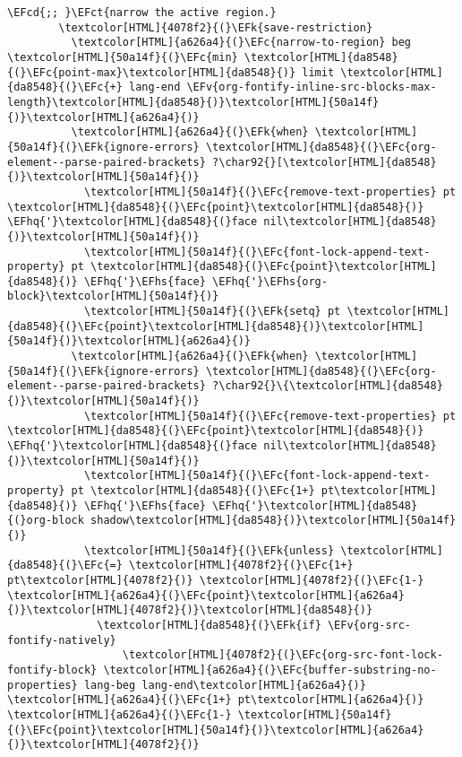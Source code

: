 \documentclass{scrartcl}
\newcommand{\EFk}[1]{\textcolor{EFk}{#1}} %
\newcommand{\EFct}[1]{\textcolor{EFct}{#1}} %
\newcommand{\EFc}[1]{\textcolor{EFc}{#1}} %
\newcommand{\EFv}[1]{\textcolor{EFv}{#1}} %
\newcommand{\EFcd}[1]{\textcolor{EFcd}{#1}} %
\newcommand{\EFhq}[1]{\textcolor{EFhq}{#1}} %
\newcommand{\EFhs}[1]{\textcolor{EFhs}{#1}} %
\begin{document}
\begin{enumerate}
\begin{Code}
\begin{Verbatim}[]
        \EFcd{;; }\EFct{narrow the active region.}
        \textcolor[HTML]{4078f2}{(}\EFk{save-restriction}
          \textcolor[HTML]{a626a4}{(}\EFc{narrow-to-region} beg \textcolor[HTML]{50a14f}{(}\EFc{min} \textcolor[HTML]{da8548}{(}\EFc{point-max}\textcolor[HTML]{da8548}{)} limit \textcolor[HTML]{da8548}{(}\EFc{+} lang-end \EFv{org-fontify-inline-src-blocks-max-length}\textcolor[HTML]{da8548}{)}\textcolor[HTML]{50a14f}{)}\textcolor[HTML]{a626a4}{)}
          \textcolor[HTML]{a626a4}{(}\EFk{when} \textcolor[HTML]{50a14f}{(}\EFk{ignore-errors} \textcolor[HTML]{da8548}{(}\EFc{org-element--parse-paired-brackets} ?\char92{}[\textcolor[HTML]{da8548}{)}\textcolor[HTML]{50a14f}{)}
            \textcolor[HTML]{50a14f}{(}\EFc{remove-text-properties} pt \textcolor[HTML]{da8548}{(}\EFc{point}\textcolor[HTML]{da8548}{)} \EFhq{'}\textcolor[HTML]{da8548}{(}face nil\textcolor[HTML]{da8548}{)}\textcolor[HTML]{50a14f}{)}
            \textcolor[HTML]{50a14f}{(}\EFc{font-lock-append-text-property} pt \textcolor[HTML]{da8548}{(}\EFc{point}\textcolor[HTML]{da8548}{)} \EFhq{'}\EFhs{face} \EFhq{'}\EFhs{org-block}\textcolor[HTML]{50a14f}{)}
            \textcolor[HTML]{50a14f}{(}\EFk{setq} pt \textcolor[HTML]{da8548}{(}\EFc{point}\textcolor[HTML]{da8548}{)}\textcolor[HTML]{50a14f}{)}\textcolor[HTML]{a626a4}{)}
          \textcolor[HTML]{a626a4}{(}\EFk{when} \textcolor[HTML]{50a14f}{(}\EFk{ignore-errors} \textcolor[HTML]{da8548}{(}\EFc{org-element--parse-paired-brackets} ?\char92{}\{\textcolor[HTML]{da8548}{)}\textcolor[HTML]{50a14f}{)}
            \textcolor[HTML]{50a14f}{(}\EFc{remove-text-properties} pt \textcolor[HTML]{da8548}{(}\EFc{point}\textcolor[HTML]{da8548}{)} \EFhq{'}\textcolor[HTML]{da8548}{(}face nil\textcolor[HTML]{da8548}{)}\textcolor[HTML]{50a14f}{)}
            \textcolor[HTML]{50a14f}{(}\EFc{font-lock-append-text-property} pt \textcolor[HTML]{da8548}{(}\EFc{1+} pt\textcolor[HTML]{da8548}{)} \EFhq{'}\EFhs{face} \EFhq{'}\textcolor[HTML]{da8548}{(}org-block shadow\textcolor[HTML]{da8548}{)}\textcolor[HTML]{50a14f}{)}
            \textcolor[HTML]{50a14f}{(}\EFk{unless} \textcolor[HTML]{da8548}{(}\EFc{=} \textcolor[HTML]{4078f2}{(}\EFc{1+} pt\textcolor[HTML]{4078f2}{)} \textcolor[HTML]{4078f2}{(}\EFc{1-} \textcolor[HTML]{a626a4}{(}\EFc{point}\textcolor[HTML]{a626a4}{)}\textcolor[HTML]{4078f2}{)}\textcolor[HTML]{da8548}{)}
              \textcolor[HTML]{da8548}{(}\EFk{if} \EFv{org-src-fontify-natively}
                  \textcolor[HTML]{4078f2}{(}\EFc{org-src-font-lock-fontify-block} \textcolor[HTML]{a626a4}{(}\EFc{buffer-substring-no-properties} lang-beg lang-end\textcolor[HTML]{a626a4}{)} \textcolor[HTML]{a626a4}{(}\EFc{1+} pt\textcolor[HTML]{a626a4}{)} \textcolor[HTML]{a626a4}{(}\EFc{1-} \textcolor[HTML]{50a14f}{(}\EFc{point}\textcolor[HTML]{50a14f}{)}\textcolor[HTML]{a626a4}{)}\textcolor[HTML]{4078f2}{)}

\end{Verbatim}
\end{Code}
\end{enumerate}
\end{document}
